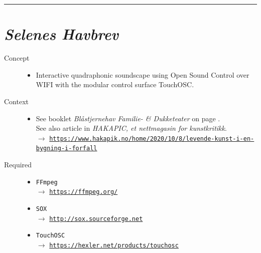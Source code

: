 \bigskip

\begin{center}\rule{0.5\linewidth}{0.5pt}\end{center}

\bigskip


\section*{\textsl{Selenes Havbrev}}


\bigskip

\begin{description}
\item[Concept] \hfill 
\begin{itemize}
\item[] Interactive quadraphonic soundscape using Open Sound Control over WIFI with the modular control surface TouchOSC.
\end{itemize}

\item[Context] \hfill 
\begin{itemize}
\item[] 
See booklet \textsl{Bl\aa stjernehav Familie- \& Dukketeater} on page \pageref{psh}.\\
See also article in \textsl{HAKAPIC, et nettmagasin for kunstkritikk}.\\
$\rightarrow$ \href{https://www.hakapik.no/home/2020/10/8/levende-kunst-i-en-bygning-i-forfall}{\texttt{\scriptsize https://www.hakapik.no/home/2020/10/8/levende-kunst-i-en-bygning-i-forfall}}

\end{itemize}

\item[Required] \hfill 
\begin{itemize}
\setlength\itemsep{1em}
\item[] \texttt{FFmpeg} \\ $\rightarrow$ \href{https://ffmpeg.org/}{\texttt{\small https://ffmpeg.org/}}
\item[] \texttt{SOX} \\ $\rightarrow$ \href{http://sox.sourceforge.net/}{\texttt{\small http://sox.sourceforge.net}}
\item[] \texttt{TouchOSC} \\ $\rightarrow$ \href{https://hexler.net/products/touchosc}{\texttt{\small https://hexler.net/products/touchosc}}
\end{itemize}


\end{description}
